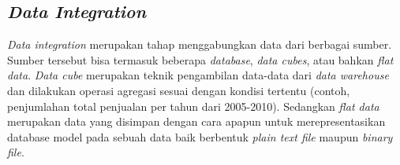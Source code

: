 




\subsection{\textsl{Data Integration}}
\textsl{Data integration} merupakan tahap menggabungkan data dari berbagai sumber. Sumber tersebut bisa termasuk beberapa \textsl{database}, \textsl{data cubes}, atau bahkan \textsl{flat data}. \textsl{Data cube} merupakan teknik pengambilan data-data dari \textsl{data warehouse} dan dilakukan operasi agregasi sesuai dengan kondisi tertentu (contoh, penjumlahan total penjualan per tahun dari 2005-2010). Sedangkan \textsl{flat data} merupakan data yang disimpan dengan cara apapun untuk merepresentasikan database model pada sebuah data baik berbentuk \textsl{plain text file} maupun \textsl{binary file}. 

